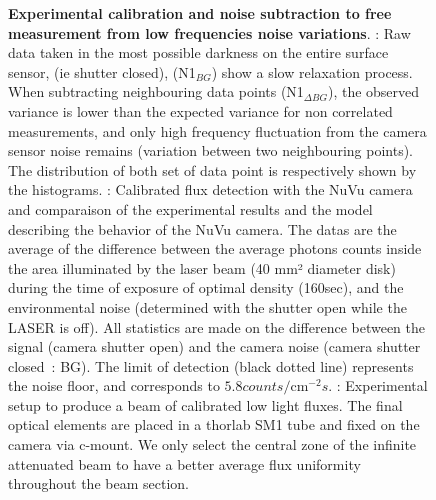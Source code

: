 \begin{figure}[htbp]
\begin{center}
\caption{
{\bf Experimental calibration and noise subtraction to free measurement from low frequencies noise variations}. 
 : Raw data taken in the most possible darkness on the entire surface sensor, (ie shutter closed), (N1$_{BG}$) show a slow relaxation process. 
When subtracting neighbouring data points (N1$_{\Delta BG}$),  the observed variance is lower than the expected variance for non correlated measurements, and only high frequency fluctuation from the camera sensor noise remains (variation between two neighbouring points).
The distribution of both set of data point is respectively shown by the histograms.
 : Calibrated flux detection with the NuVu camera and comparaison of the experimental results and the model describing the behavior of the NuVu camera.
The datas are the average of the difference between the average photons counts inside the area illuminated by the laser  beam (40 mm²  diameter disk) during the  time of exposure of optimal density  (160sec), and  the environmental noise (determined with the shutter open while the LASER is off). 
All statistics are made on the difference between the signal (camera shutter open) and the camera noise (camera shutter closed : BG).
The limit of detection (black dotted line) represents the noise floor, and corresponds to $5.8 counts /\mathrm{cm}^{-2}s$.
  : Experimental setup to produce a beam of calibrated low light fluxes. The final optical elements are placed in a thorlab SM1 tube and fixed on the camera via c-mount. 
We only select the central zone of the infinite attenuated beam to have a better average flux uniformity throughout the beam section.
}
\label{fig:CalibCorrel}
\end{center}
\end{figure}
